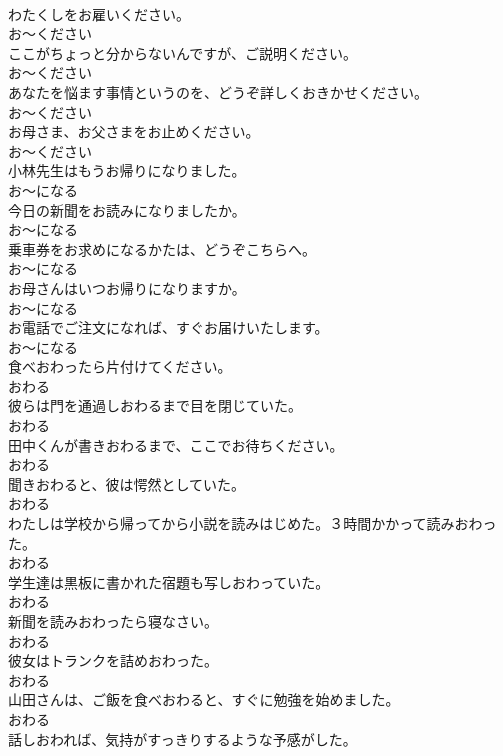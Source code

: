 \documentclass[8pt]{extreport}
\begin{document}
\begin{CJK}{UTF8}{min}
\\	わたくしをお雇いください。	
\\	お～ください	
\\	ここがちょっと分からないんですが、ご説明ください。	
\\	お～ください	
\\	あなたを悩ます事情というのを、どうぞ詳しくおきかせください。	
\\	お～ください	
\\	お母さま、お父さまをお止めください。	
\\	お～ください	
\\	小林先生はもうお帰りになりました。	
\\	お～になる	
\\	今日の新聞をお読みになりましたか。	
\\	お～になる	
\\	乗車券をお求めになるかたは、どうぞこちらへ。	
\\	お～になる	
\\	お母さんはいつお帰りになりますか。	
\\	お～になる	
\\	お電話でご注文になれば、すぐお届けいたします。	
\\	お～になる	
\\	食べおわったら片付けてください。	
\\	おわる	
\\	彼らは門を通過しおわるまで目を閉じていた。	
\\	おわる	
\\	田中くんが書きおわるまで、ここでお待ちください。	
\\	おわる	
\\	聞きおわると、彼は愕然としていた。	
\\	おわる	
\\	わたしは学校から帰ってから小説を読みはじめた。３時間かかって読みおわった。	
\\	おわる	
\\	学生達は黒板に書かれた宿題も写しおわっていた。	
\\	おわる	
\\	新聞を読みおわったら寝なさい。	
\\	おわる	
\\	彼女はトランクを詰めおわった。	
\\	おわる	
\\	山田さんは、ご飯を食べおわると、すぐに勉強を始めました。	
\\	おわる	
\\	話しおわれば、気持がすっきりするような予感がした。	

\end{CJK}
\end{document}
